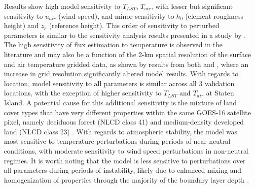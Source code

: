 Results show high model sensitivity to $T_{LST}$, $T_{air}$, with lesser but significant sensitivity to $u_{air}$ (wind speed), and minor sensitivity to $h_0$ (element roughness height) and $z_r$ (reference height). This order of sensitivity to perturbed parameters is similar to the sensitivity analysis results presented in a study by \citet{Feigenwinter_2018}. The high sensitivity of flux estimation to temperature is observed in the literature \citep{Brenner_2017, Cammalleri_2012, Xia_2016} and may also be a function of the 2-km spatial resolution of the surface and air temperature gridded data, as shown by results from both \citet{Mott_2015} and \citet{Xu_2008}, where an increase in grid resolution significantly altered model results. With regards to location, model sensitivity to all parameters is similar across all 3 validation locations, with the exception of higher sensitivity to $T_{LST}$ and $T_{air}$ at Staten Island. A potential cause for this additional sensitivity is the mixture of land cover types that have very different properties within the same GOES-16 satellite pixel, namely deciduous forest (NLCD class 41) and medium-density developed land (NLCD class 23) \citep{Yang_2018}. With regards to atmospheric stability, the model was most sensitive to temperature perturbations during periods of near-neutral conditions, with moderate sensitivity to wind speed perturbations in non-neutral regimes. It is worth noting that the model is less sensitive to perturbations over all parameters during periods of instability, likely due to enhanced mixing and homogenization of properties through the majority of the boundary layer depth \citep{Garratt_1994, Stull_1988}.

